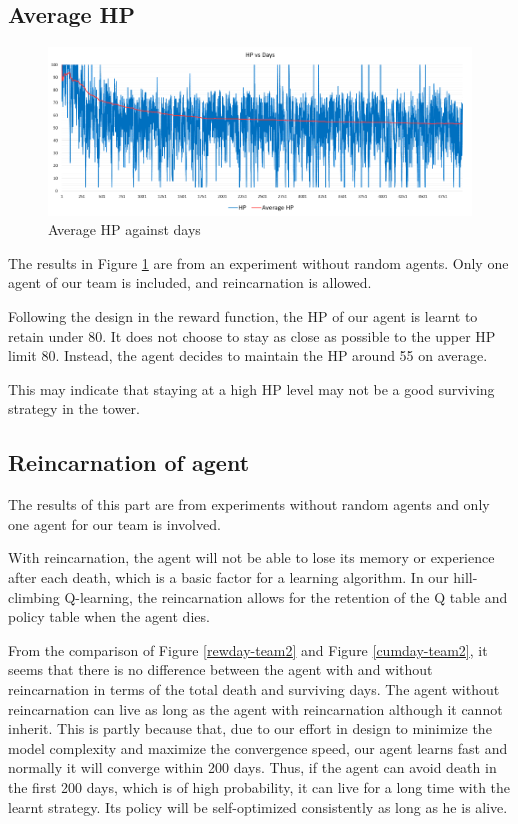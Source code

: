 \subsection{Average HP}
\begin{figure}
\centering
\includegraphics{004_team_2_agent_design/avhpdays}
\caption{Average HP against days}
\label{avhp-team2}
\end{figure}

The results in Figure \ref{avhp-team2} are from an experiment without random agents. Only one agent of our team is included, and reincarnation is allowed. 

Following the design in the reward function, the HP of our agent is learnt to retain under 80. It does not choose to stay as close as possible to the upper HP limit 80. Instead, the agent decides to maintain the HP around 55 on average. 

This may indicate that staying at a high HP level may not be a good surviving strategy in the tower. 

\subsection{Reincarnation of agent}
The results of this part are from experiments without random agents and only one agent for our team is involved.

With reincarnation, the agent will not be able to lose its memory or experience after each death, which is a basic factor for a learning algorithm. In our hill-climbing Q-learning, the reincarnation allows for the retention of the Q table and policy table when the agent dies. 

From the comparison of Figure \ref{rewday-team2} and Figure \ref{cumday-team2}, it seems that there is no difference between the agent with and without reincarnation in terms of the total death and surviving days. The agent without reincarnation can live as long as the agent with reincarnation although it cannot inherit. This is partly because that, due to our effort in design to minimize the model complexity and maximize the convergence speed, our agent learns fast and normally it will converge within 200 days. Thus, if the agent can avoid death in the first 200 days, which is of high probability, it can live for a long time with the learnt strategy. Its policy will be self-optimized consistently as long as he is alive. 

